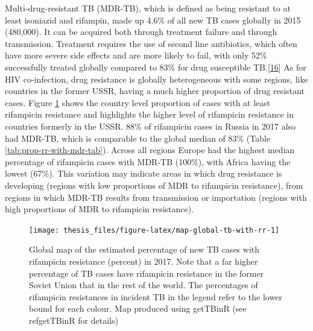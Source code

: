 \documentclass[11pt,twoside]{bristolthesis}
\begin{document}
  Multi-drug-resistant TB (MDR-TB), which is defined as being resistant to at least isoniazid and rifampin, made up 4.6\% of all new TB cases globally in 2015 (480,000). It can be acquired both through treatment failure and through transmission. Treatment requires the use of second line antibiotics, which often have more severe side effects and are more likely to fail, with only 52\% successfully treated globally compared to 83\% for drug susceptible TB.{[}\protect\hyperlink{ref-WHOTB2016}{16}{]} As for HIV co-infection, drug resistance is globally heterogeneous with some regions, like countries in the former USSR, having a much higher proportion of drug resistant cases. Figure \ref{fig:map-global-tb-with-rr} shows the country level proportion of cases with at least rifampicin resistance and highlights the higher level of rifampicin resistance in countries formerly in the USSR. 88\% of rifampicin cases in Russia in 2017 also had MDR-TB, which is comparable to the global median of 83\% (Table \ref{tab:prop-rr-with-mdr-tab}). Across all regions Europe had the highest median percentage of rifampicin cases with MDR-TB (100\%), with Africa having the lowest (67\%). This variation may indicate areas in which drug resistance is developing (regions with low proportions of MDR to rifampicin resistance), from regions in which MDR-TB results from transmission or importation (regions with high proportions of MDR to rifampicin resistance).
  \begin{figure}
  
  {\centering \texttt{[image: thesis\_files/figure-latex/map-global-tb-with-rr-1]} 
  
  }
  
  \caption[Global map of the estimated percentage of new TB cases with rifampicin resistance (percent) in 2017.]{Global map of the estimated percentage of new TB cases with rifampicin resistance (percent) in 2017. Note that a far higher percentage of TB cases have rifampicin resistance in the former Soviet Union that in the rest of the world. The percentages of rifampicin resistances in incident TB in the legend refer to the lower bound for each colour. Map produced using getTBinR (see \\ref{getTBinR} for details)}\label{fig:map-global-tb-with-rr}
  \end{figure}
\end{document}
